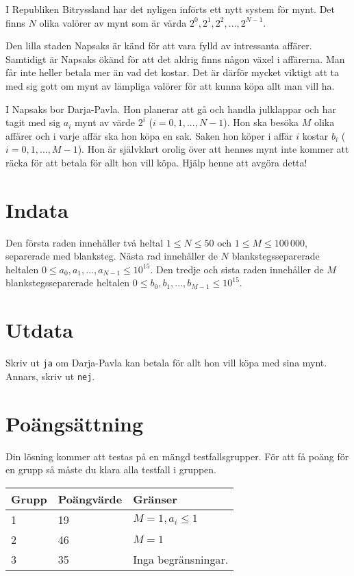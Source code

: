 I Republiken Bitryssland har det nyligen införts ett nytt system för mynt.
Det finns $N$ olika valörer av mynt som är värda $2^0, 2^1, 2^2, ..., 2^{N-1}$. 

Den lilla staden Napsaks är känd för att vara fylld av intressanta affärer.
Samtidigt är Napsaks ökänd för att det aldrig finns någon växel i affärerna.
Man får inte heller betala mer än vad det kostar.
Det är därför mycket viktigt att ta med sig gott om mynt av lämpliga valörer för att kunna köpa allt man vill ha. 

I Napsaks bor Darja-Pavla.
Hon planerar att gå och handla julklappar och har tagit med sig $a_i$ mynt av värde $2^i$ ($i = 0, 1, ..., N-1$).
Hon ska besöka $M$ olika affärer och i varje affär ska hon köpa en sak.
Saken hon köper i affär $i$ kostar $b_i$ ($i = 0, 1, ..., M-1$).
Hon är självklart orolig över att hennes mynt inte kommer att räcka för att betala för allt hon vill köpa. Hjälp henne att avgöra detta!

\section*{Indata}
Den första raden innehåller två heltal $1 \le N \le 50$ och $1 \le M \le 100\,000$, separerade med blanksteg.
Nästa rad innehåller de $N$ blankstegsseparerade heltalen $0 \le a_0, a_1, ..., a_{N-1} \le 10^{15}$.
Den tredje och sista raden innehåller de $M$ blankstegsseparerade heltalen $0 \le b_0, b_1, ..., b_{M-1} \le 10^{15}$.

\section*{Utdata}
Skriv ut \texttt{ja} om Darja-Pavla kan betala för allt hon vill köpa med sina mynt.
Annars, skriv ut \texttt{nej}.

\section*{Poängsättning}
Din lösning kommer att testas på en mängd testfallsgrupper. För att få poäng för en grupp
så måste du klara alla testfall i gruppen.

\noindent
\begin{tabular}{| l | l | l |}
\hline
Grupp & Poängvärde & Gränser \\ \hline
1     & 19         & $M = 1, a_i \le 1$ \\ \hline
2     & 46         & $M = 1$ \\ \hline
3     & 35         & Inga begränsningar. \\ \hline
\end{tabular}

